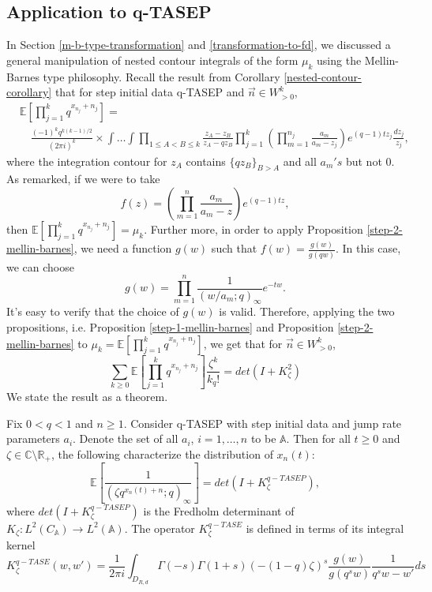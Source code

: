 \subsection{Application to q-TASEP}
In Section \ref{m-b-type-transformation} and \ref{transformation-to-fd}, we discussed a general manipulation of nested contour integrals of the form $\mu_k$ using the Mellin-Barnes type philosophy. Recall the result from Corollary \ref{nested-contour-corollary} that for step initial data q-TASEP and $\vec{n} \in W^k_{>0}$, 
\begin{align*}
& \mathbb{E} \left[ \prod_{j=1}^k q^{x_{n_j}+n_j} \right] = \\
& \quad \frac{(-1)^k q^{k(k-1)/2}}{(2 \pi i)^k} \times \int \dots \int \prod_{1 \le A < B \le k} \frac{z_A - z_B}{z_A - qz_B} \prod_{j=1}^k \left( \prod_{m=1}^{n_j} \frac{a_m}{a_m - z_j}\right) e^{(q-1)tz_j} \frac{dz_j}{z_j},
\end{align*}
where the integration contour for $z_A$ contains $\{qz_B\}_{B > A}$ and all $a_m's$ but not $0$. As remarked, if we were to take $$f(z) = \left( \prod_{m=1}^{n} \frac{a_m}{a_m - z} \right) e^{(q-1)tz},$$ then $\mathbb{E} \left[ \prod_{j=1}^k q^{x_{n_j}+n_j} \right] = \mu_k$. Further more, in order to apply Proposition \ref{step-2-mellin-barnes}, we need a function $g(w)$ such that $f(w) = \frac{g(w)}{g(qw)}$. In this case, we can choose $$g(w) = \prod_{m=1}^{n} \frac{1}{(w/a_m; q)_{\infty}} e^{-tw}.$$ It's easy to verify that the choice of $g(w)$ is valid. Therefore, applying the two propositions, i.e. Proposition \ref{step-1-mellin-barnes} and Proposition \ref{step-2-mellin-barnes} to $\mu_k = \mathbb{E} \left[ \prod_{j=1}^k q^{x_{n_j}+n_j} \right]$, we get that for $\vec{n} \in W^k_{>0}$,
\begin{equation}
\label{m-b-application-to-qtasep-raw}
\sum_{k \ge 0} \mathbb{E} \left[ \prod_{j=1}^k q^{x_{n_j}+n_j} \right] \frac{\zeta^k}{k_q!} = det(I+K^2_{\zeta})
\end{equation}
We state the result as a theorem. 
\begin{theorem}
Fix $0 < q < 1$ and $n \ge 1$. Consider q-TASEP with step initial data and jump rate parameters $a_i$. Denote the set of all $a_i$, $i = 1, \dots, n$ to be $\mathbb{A}$. Then for all $t \ge 0$ and $\zeta \in \mathbb{C} \setminus \mathbb{R}_+$, the following characterize the distribution of $x_n(t)$:
\begin{equation}
\label{m-b-application-to-qtasep}
\mathbb{E} \left[ \frac{1}{(\zeta q^{x_n(t)+n}; q)_{\infty}} \right] = det(I+K_{\zeta}^{q-TASEP}),
\end{equation}
where $det(I+K_{\zeta}^{q-TASEP})$ is the Fredholm determinant of $K_{\zeta}: L^2(C_{\mathbb{A}}) \rightarrow L^2(\mathbb{A})$. The operator $K_{\zeta}^{q-TASE}$ is defined in terms of its integral kernel
$$K_{\zeta}^{q-TASE}(w,w') = \frac{1}{2 \pi i} \int_{D_{R,d}} \Gamma(-s) \Gamma(1+s) (-(1-q)\zeta)^s \frac{g(w)}{g(q^sw)} \frac{1}{q^sw - w'} ds$$
\end{theorem}